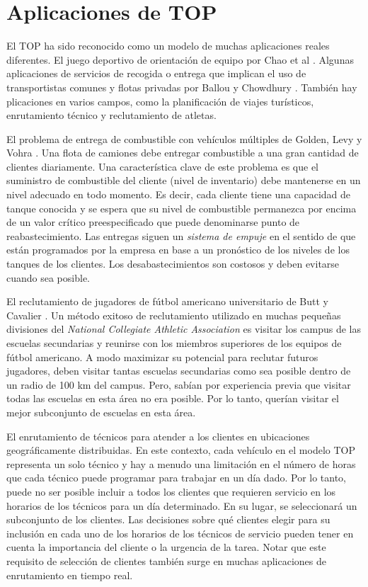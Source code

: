 \section{Aplicaciones de TOP}

El TOP ha sido reconocido como un modelo de muchas aplicaciones reales diferentes. El juego deportivo de orientación de equipo por Chao et al \cite{ChaoGoldenWasil}. Algunas aplicaciones de servicios de recogida o entrega que implican el uso de transportistas comunes y flotas privadas por Ballou y Chowdhury \cite{BallouChowdhury}. También hay plicaciones en varios campos, como la planificación de viajes turísticos, enrutamiento técnico y reclutamiento de atletas.

\bigskip

El problema de entrega de combustible con vehículos múltiples de Golden, Levy y Vohra \cite{goldenlevyvohra}. Una flota de camiones debe entregar combustible a una gran cantidad de clientes diariamente. Una característica clave de este problema es que el suministro de combustible del cliente (nivel de inventario) debe mantenerse en un nivel adecuado en todo momento. Es decir, cada cliente tiene una capacidad de tanque conocida y se espera que su nivel de combustible permanezca por encima de un valor crítico preespecificado que puede denominarse punto de reabastecimiento. Las entregas siguen un \textit{sistema de empuje} en el sentido de que están programados por la empresa en base a un pronóstico de los niveles de los tanques de los clientes. Los desabastecimientos son costosos y deben evitarse cuando sea posible.

\bigskip

El reclutamiento de jugadores de fútbol americano universitario de Butt y Cavalier \cite{ButtCavalier}. Un método exitoso de reclutamiento utilizado en muchas pequeñas divisiones del \textit{National Collegiate Athletic Association} es visitar los campus de las escuelas secundarias y reunirse con los miembros superiores de los equipos de fútbol americano. A modo maximizar su potencial para reclutar futuros jugadores, deben visitar tantas escuelas secundarias como sea posible dentro de un radio de 100 km del campus. Pero, sabían por experiencia previa que visitar todas las escuelas en esta área no era posible. Por lo tanto, querían visitar el mejor subconjunto de escuelas en esta área.

\bigskip

El enrutamiento de técnicos para atender a los clientes en ubicaciones geográficamente distribuidas. En este contexto, cada vehículo en el modelo TOP representa un solo técnico y hay a menudo una limitación en el número de horas que cada técnico puede programar para trabajar en un día dado. Por lo tanto, puede no ser posible incluir a todos los clientes que requieren servicio en los horarios de los técnicos para un día determinado. En su lugar, se seleccionará un subconjunto de los clientes. Las decisiones sobre qué clientes elegir para su inclusión en cada uno de los horarios de los técnicos de servicio pueden tener en cuenta la importancia del cliente o la urgencia de la tarea. Notar que este requisito de selección de clientes también surge en muchas aplicaciones de enrutamiento en tiempo real.

